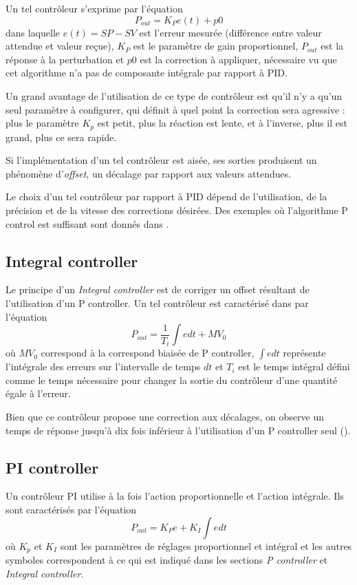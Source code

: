 \documentclass[a4paper,10pt]{report}
\begin{document}
Un tel contrôleur s'exprime par l'équation
\begin{equation}P_{out} = K_{P}e(t) + p0\end{equation}
dans laquelle $e(t) = SP - SV$ est l'erreur mesurée (différence entre valeur attendue et valeur reçue), $K_{P}$ est le paramètre de gain proportionnel, $P_{out}$ est la réponse à la perturbation et $p0$ est la correction à appliquer, nécessaire vu que cet algorithme n'a pas de composante intégrale par rapport à PID.

Un grand avantage de l'utilisation de ce type de contrôleur est qu'il n'y a qu'un seul paramètre à configurer, qui définit à quel point la correction sera agressive : plus le paramètre $K_{p}$ est petit, plus la réaction est lente, et à l'inverse, plus il est grand, plus ce sera rapide.

Si l'implémentation d'un tel contrôleur est aisée, ses sorties produisent un phénomène d'\emph{offset}, un décalage par rapport aux valeurs attendues.

Le choix d'un tel contrôleur par rapport à PID dépend de l'utilisation, de la précision et de la vitesse des corrections désirées.
Des exemples où l'algorithme P control est suffisant sont donnés dans \cite{sellers2001overview}.

\subsection{Integral controller}
Le principe d'un \emph{Integral controller} est de corriger un offset résultant de l'utilisation d'un P controller.
Un tel contrôleur est caractérisé dans \cite{svrcek2006real} par l'équation
\begin{equation}P_{out} = \frac{1}{T_{i}}\int e dt + MV_{0}\end{equation}
où $MV_{0}$ correspond à la correspond biaisée de P controller,
$\int e dt$ représente l'intégrale des erreurs sur l'intervalle de temps $dt$ et $T_{i}$ est le temps intégral défini comme le temps nécessaire pour changer la sortie du contrôleur d'une quantité égale à l'erreur.

Bien que ce contrôleur propose une correction aux décalages, on observe un temps de réponse jusqu'à dix fois inférieur à l'utilisation d'un P controller seul (\cite{svrcek2006real}).

\subsection{PI controller}
Un contrôleur PI utilise à la fois l'action proportionnelle et l'action intégrale.
Ils sont caractérisés par l'équation
\begin{equation}P_{out} = K_{P} e + K_{I} \int e dt\end{equation}
où $K_{p}$ et $K_{I}$ sont les paramètres de réglages proportionnel et intégral
et les autres symboles correspondent à ce qui est indiqué dans les sections \emph{P controller} et \emph{Integral controller}.
\end{document}
